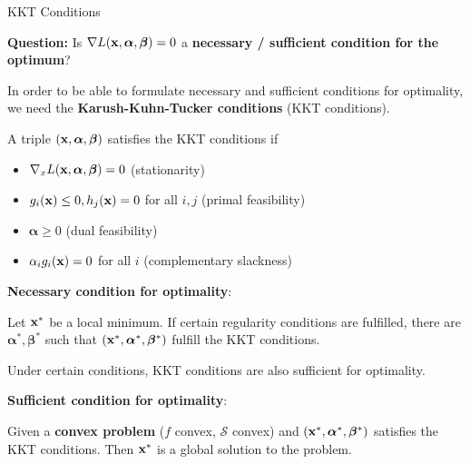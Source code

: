 \begin{vbframe}{KKT Conditions}

\textbf{Question: } Is $\nabla L(\mathbf{x}, \bm{\alpha}, \bm{\beta}) = 0$ a \textbf{necessary / sufficient condition for the optimum}?

\lz

In order to be able to formulate necessary and sufficient conditions for optimality, we need the \textbf{Karush-Kuhn-Tucker conditions} (KKT conditions).

\lz

A triple $(\mathbf{x}, \bm{\alpha}, \bm{\beta})$ satisfies the KKT conditions if

  \begin{itemize}
    \item $\nabla_x L(\mathbf{x}, \bm{\alpha}, \bm{\beta}) = 0$ (stationarity)
    \item $g_i(\mathbf{x}) \le 0, h_j(\mathbf{x}) = 0$ for all $i, j$ (primal feasibility)
    \item $\bm{\alpha} \ge 0$ (dual feasibility)
    \item $\alpha_i g_i(\mathbf{x}) = 0$ for all $i$ (complementary slackness)
  \end{itemize}



  \framebreak


\textbf{Necessary condition for optimality}:

Let $\mathbf{x}^*$ be a local minimum. If certain regularity conditions are fulfilled, there are $\bm{\alpha}^*, \bm{\beta}^*$ such that $(\mathbf{x}^*, \bm{\alpha}^*, \bm{\beta}^*)$ fulfill the KKT conditions.

  \lz

  Under certain conditions, KKT conditions are also sufficient for optimality.

  \lz

  \textbf{Sufficient condition for optimality}:

  Given a \textbf{convex problem} ($f$ convex, $\mathcal{S}$ convex) and $(\mathbf{x}^*, \bm{\alpha}^*, \bm{\beta}^*)$ satisfies the KKT conditions. Then $\mathbf{x}^*$ is a global solution to the problem.




\end{vbframe}

